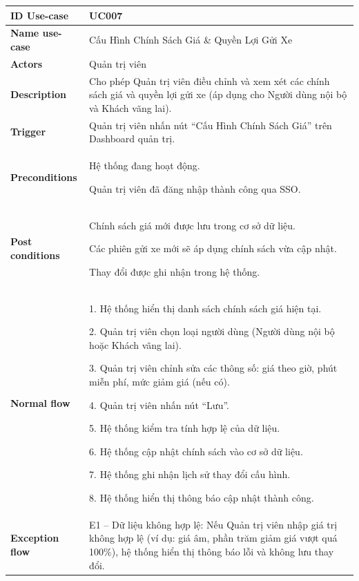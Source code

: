 \begin{table}[H]
\centering
\renewcommand{\arraystretch}{1.4}
\begin{tabular}{|p{4cm}|p{10cm}|}
\hline
\textbf{ID Use-case} & UC007 \\ \hline

\textbf{Name use-case } 
& Cấu Hình Chính Sách Giá \& Quyền Lợi Gửi Xe \\ \hline

\textbf{Actors} 
& Quản trị viên \\ \hline

\textbf{Description} 
& Cho phép Quản trị viên điều chỉnh và xem xét các chính sách giá và quyền lợi gửi xe 
(áp dụng cho Người dùng nội bộ và Khách vãng lai). \\ \hline
\textbf{Trigger} 
& Quản trị viên nhấn nút ``Cấu Hình Chính Sách Giá'' trên Dashboard quản trị. \\ \hline
\textbf{Preconditions} 
& 
Hệ thống đang hoạt động.

 Quản trị viên đã đăng nhập thành công qua SSO.
\\ \hline


\textbf{Post conditions} 
& 
Chính sách giá mới được lưu trong cơ sở dữ liệu.

    Các phiên gửi xe mới sẽ áp dụng chính sách vừa cập nhật.
    
    Thay đổi được ghi nhận trong hệ thống.
 \\ \hline

\textbf{Normal flow} 
& 

    1. Hệ thống hiển thị danh sách chính sách giá hiện tại.
    
    2. Quản trị viên chọn loại người dùng (Người dùng nội bộ hoặc Khách vãng lai).
    
    3. Quản trị viên chỉnh sửa các thông số: giá theo giờ, phút miễn phí, mức giảm giá (nếu có).
    
    4. Quản trị viên nhấn nút ``Lưu''.
    
    5. Hệ thống kiểm tra tính hợp lệ của dữ liệu.
    
    6. Hệ thống cập nhật chính sách vào cơ sở dữ liệu.
    
    7. Hệ thống ghi nhận lịch sử thay đổi cấu hình.
    
    8. Hệ thống hiển thị thông báo cập nhật thành công.
\\ \hline


\textbf{Exception flow} 
& 
E1 – Dữ liệu không hợp lệ: 
Nếu Quản trị viên nhập giá trị không hợp lệ (ví dụ: giá âm, phần trăm giảm giá vượt quá 100\%), hệ thống hiển thị thông báo lỗi và không lưu thay đổi.  


\end{tabular}
\end{table}
